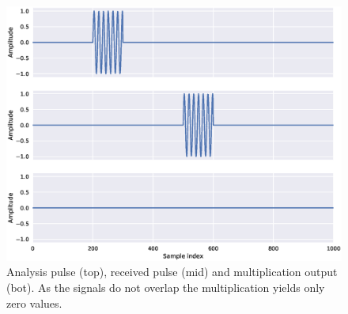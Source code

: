 

\begin{figure}[h]
	\centering
	\includegraphics[scale=0.5]{figs_temp/mixing0}
	\caption{Analysis pulse (top), received pulse (mid) and multiplication output (bot). As the signals do not overlap the multiplication yields only zero values.}
	\label{fig:mix0}
\end{figure}

